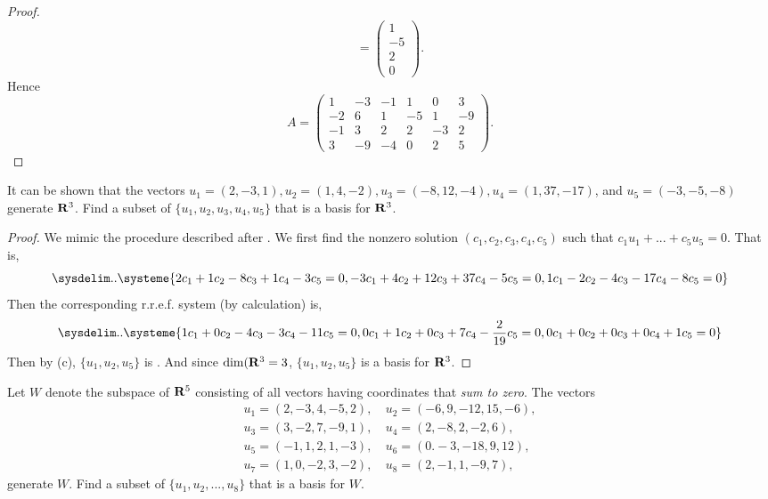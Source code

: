 \begin{proof}
\[        = \begin{pmatrix} 1 \\ -5 \\ 2 \\ 0 \end{pmatrix}.
\]
Hence
\[
    A = \left(\begin{array}{cccccc}
        1 & -3 & -1 & 1 & 0 & 3 \\
        -2 & 6 & 1 & -5 & 1 & -9 \\
        -1 & 3 & 2 & 2 & -3 & 2 \\
        3 & -9 & -4 & 0 & 2 & 5
    \end{array}\right).
\]
\end{proof}

\begin{exercise} \label{exercise 3.4.7}
\sloppy It can be shown that the vectors \(u_1 = (2, -3, 1), u_2 = (1, 4, -2), u_3 = (-8, 12, -4), u_4 = (1, 37, -17)\), and \(u_5 = (-3, -5, -8)\) generate \(\mathbf{R}^3\).
Find a subset of \(\{ u_1, u_2, u_3, u_4, u_5 \}\) that is a basis for \(\mathbf{R}^3\).
\end{exercise}

\begin{proof}
We mimic the procedure described after .
We first find the nonzero solution \((c_1, c_2, c_3, c_4, c_5)\) such that \(c_1 u_1 + ... + c_5 u_5 = 0\).
That is,
\[
    \sysdelim..\systeme{
         2 c_1 + 1 c_2 -  8 c_3 +  1 c_4 - 3 c_5 = 0,
        -3 c_1 + 4 c_2 + 12 c_3 + 37 c_4 - 5 c_5 = 0,
         1 c_1 - 2 c_2 -  4 c_3 - 17 c_4 - 8 c_5 = 0
    }
\]
Then the corresponding r.r.e.f. system (by calculation) is,
\[
    \sysdelim..\systeme{
         1 c_1 + 0 c_2 - 4 c_3 - 3 c_4 -           11 c_5 = 0,
         0 c_1 + 1 c_2 + 0 c_3 + 7 c_4 - \frac{2}{19} c_5 = 0,
         0 c_1 + 0 c_2 + 0 c_3 + 0 c_4 +            1 c_5 = 0
    }
\]
\sloppy Then by (c), \(\{ u_1, u_2, u_5 \}\) is \LID{}.
And since \(\dim(\mathbf{R}^3 = 3\), \(\{ u_1, u_2, u_5 \}\) is a basis for \(\mathbf{R}^3\).
\end{proof}

\begin{exercise} \label{exercise 3.4.8}
Let \(W\) denote the subspace of \(\mathbf{R}^5\) consisting of all vectors having coordinates that \emph{sum to zero}.
The vectors
\begin{align*}
    u_1 = (2, -3, 4, -5, 2), &\ u_2 = (-6, 9, -12, 15, -6), \\
    u_3 = (3, -2, 7, -9, 1), &\ u_4 = (2, -8, 2, -2, 6), \\
    u_5 = (-1, 1, 2, 1, -3), &\ u_6 = (0. -3, -18, 9, 12), \\
    u_7 = (1, 0, -2, 3, -2), &\ u_8 = (2, -1, 1, -9, 7),
\end{align*}
generate \(W\).
Find a subset of \(\{ u_1, u_2, ..., u_8 \}\) that is a basis for \(W\).
\end{exercise}

